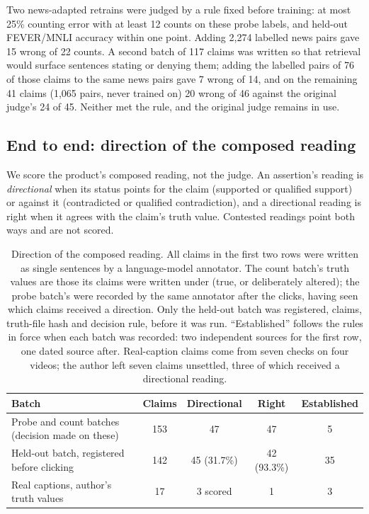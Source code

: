 \documentclass[11pt]{article}
\begin{document}
Two news-adapted retrains were judged by a rule fixed before training: at most 25\% counting error with at
least 12 counts on these probe labels, and held-out FEVER/MNLI accuracy within one point. Adding 2,274
labelled news pairs gave 15 wrong of 22 counts. A second batch of 117 claims was written so that retrieval
would surface sentences stating or denying them; adding the labelled pairs of 76 of those claims to the
same news pairs gave 7 wrong of 14, and on the remaining 41 claims (1,065 pairs, never trained on) 20 wrong
of 46 against the original judge's 24 of 45. Neither met the rule, and the original judge remains in use.

\subsection{End to end: direction of the composed reading}

We score the product's composed reading, not the judge. An assertion's reading is \emph{directional} when
its status points for the claim (supported or qualified support) or against it (contradicted or qualified
contradiction), and a directional reading is right when it agrees with the claim's truth value. Contested
readings point both ways and are not scored.

\begin{table}[t]
\centering
\small
\begin{tabular}{lcccc}
\toprule
Batch & Claims & Directional & Right & Established \\
\midrule
Probe and count batches (decision made on these) & 153 & 47 & 47 & 5 \\
Held-out batch, registered before clicking & 142 & 45 (31.7\%) & 42 (93.3\%) & 35 \\
Real captions, author's truth values & 17 & 3 scored & 1 & 3 \\
\bottomrule
\end{tabular}
\caption{Direction of the composed reading. All claims in the first two rows were written as single
sentences by a language-model annotator. The count batch's truth values are those its claims were written
under (true, or deliberately altered); the probe batch's were recorded by the same annotator after the
clicks, having seen which claims received a direction. Only the held-out batch was registered, claims,
truth-file hash and decision rule, before it was run. ``Established'' follows the rules in force when each
batch was recorded: two independent sources for the first row, one dated source after. Real-caption claims
come from seven checks on four videos; the author left seven claims unsettled, three of which received a
directional reading.}
\label{tab:directions}
\end{table}
\end{document}
